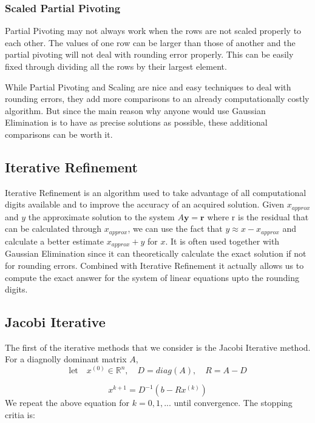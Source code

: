 \documentclass[11pt]{article}	%
\begin{document}
    \subsubsection{Scaled Partial Pivoting}
    Partial Pivoting may not always work when the rows are not scaled properly to each other. The values of one row can be larger than those of another and the partial pivoting will not deal with rounding error properly. This can be easily fixed through dividing all the rows by their largest element. 
    
   	While Partial Pivoting and Scaling are nice and easy techniques to deal with rounding errors, they add more comparisons to an already computationally costly algorithm. But since the main reason why anyone would use Gaussian Elimination is to have as precise solutions as possible, these additional comparisons can be worth it.
   	
\subsection{Iterative Refinement}

Iterative Refinement is an algorithm used to take advantage of all computational digits available and to improve the accuracy of an acquired solution. Given $x_{approx}$ and $y$ the approximate solution to the system $A\textbf{y} = \textbf{r}$ where r is the residual that can be calculated through $x_{approx}$, we can use the fact that $y \approx x - x_{approx}$ and calculate a better estimate $x_{approx} + y$ for $x$. It is often used together with Gaussian Elimination since it can theoretically calculate the exact solution if not for rounding errors. Combined with Iterative Refinement it actually allows us to compute the exact answer for the system of linear equations upto the rounding digits. 


\subsection{Jacobi Iterative}
    The first of the iterative methods that we consider is the Jacobi Iterative method. For a diagnolly dominant matrix $A$,
    \begin{equation}\label{eq:jacobi-eq-1-qualifier}
        \textrm{let} \quad x^{(0)}\in {\mathbb R}^n,\quad D = diag(A),\quad R = A - D
    \end{equation}

    \begin{equation}\label{eq:jacobi-eq-1}
        x^{k+1} = D^{-1}(b- Rx^{(k)})
    \end{equation}
    We repeat the above equation for $k = 0, 1, ...$ until convergence. The stopping critia is:
\end{document}
